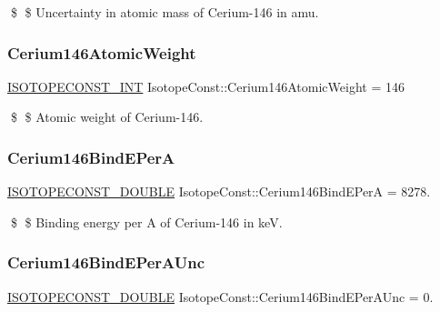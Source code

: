 \$ \$ Uncertainty in atomic mass of Cerium-\/146 in amu. \mbox{\label{group___isotope_const-_cerium-_ce146_ga226917e46f5ee7e38e70671f3dd177dc}} 
\subsubsection{\texorpdfstring{Cerium146\+Atomic\+Weight}{Cerium146AtomicWeight}}
{\footnotesize\ttfamily \mbox{\hyperlink{group___isotope_const-_macros_ga5f18360b3e99483a35c32d789e62621c}{I\+S\+O\+T\+O\+P\+E\+C\+O\+N\+S\+T\+\_\+\+I\+NT}} Isotope\+Const\+::\+Cerium146\+Atomic\+Weight = 146}

\$ \$ Atomic weight of Cerium-\/146. \mbox{\label{group___isotope_const-_cerium-_ce146_gae86bbe8799c2b1547d8873353772dbc1}} 
\subsubsection{\texorpdfstring{Cerium146\+Bind\+E\+PerA}{Cerium146BindEPerA}}
{\footnotesize\ttfamily \mbox{\hyperlink{group___isotope_const-_macros_ga8f45a7272ce02c0b4c65c44636ed719a}{I\+S\+O\+T\+O\+P\+E\+C\+O\+N\+S\+T\+\_\+\+D\+O\+U\+B\+LE}} Isotope\+Const\+::\+Cerium146\+Bind\+E\+PerA = 8278.}

\$ \$ Binding energy per A of Cerium-\/146 in keV. \mbox{\label{group___isotope_const-_cerium-_ce146_gac93840f703735f5131b791d66f9dac21}} 
\subsubsection{\texorpdfstring{Cerium146\+Bind\+E\+Per\+A\+Unc}{Cerium146BindEPerAUnc}}
{\footnotesize\ttfamily \mbox{\hyperlink{group___isotope_const-_macros_ga8f45a7272ce02c0b4c65c44636ed719a}{I\+S\+O\+T\+O\+P\+E\+C\+O\+N\+S\+T\+\_\+\+D\+O\+U\+B\+LE}} Isotope\+Const\+::\+Cerium146\+Bind\+E\+Per\+A\+Unc = 0.}

